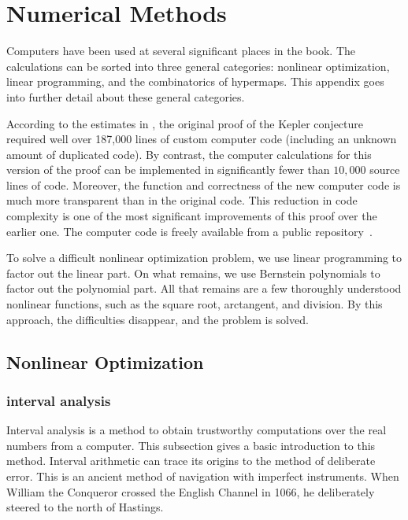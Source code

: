 %
\chapter{Numerical Methods}

Computers have been used at several significant places in the book.
The calculations can be sorted into three general categories:
nonlinear optimization, linear programming, and the combinatorics of
hypermaps. This appendix goes into further detail about these general
categories.

According to the estimates in \cite{unknown}, the original proof of
the Kepler conjecture required well over 187,000 lines of custom
computer code (including an unknown amount of duplicated code).  By
contrast, the computer calculations for this version of the proof can
be implemented in significantly fewer than $10,000$ source lines of code.
Moreover, the function and correctness of the new computer code is
much more transparent than in the original code.  This reduction in
code complexity is one of the most significant improvements of this
proof over the earlier one.  The computer code is freely available
from a public repository~\cite{unknown}.

To solve a difficult nonlinear optimization problem, we use linear
programming to factor out the linear part.  On what remains, we use
Bernstein polynomials to factor out the polynomial part.  All that
remains are a few thoroughly understood nonlinear functions, such as
the square root, arctangent, and division.  By this approach, the difficulties
disappear, and the problem is solved.


\section{Nonlinear Optimization}

\subsection{interval analysis}%
\label{sec:bounds-simplex}

Interval analysis is a method to obtain trustworthy computations over
the real numbers from a computer.  This subsection gives a basic
introduction to this method.  Interval arithmetic can trace its
origins to the method of deliberate error.  This is an ancient method
of navigation with imperfect instruments.  When William the Conqueror
crossed the English Channel in 1066, he deliberately steered to the
north of Hastings.

